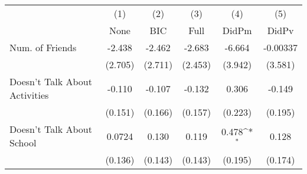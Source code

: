 {
\def\sym#1{\ifmmode^{#1}\else\(^{#1}\)\fi}
\begin{tabular}{l*{5}{c}}
\toprule
            &\multicolumn{1}{c}{(1)}&\multicolumn{1}{c}{(2)}&\multicolumn{1}{c}{(3)}&\multicolumn{1}{c}{(4)}&\multicolumn{1}{c}{(5)}\\
            &\multicolumn{1}{c}{None}&\multicolumn{1}{c}{BIC}&\multicolumn{1}{c}{Full}&\multicolumn{1}{c}{DidPm}&\multicolumn{1}{c}{DidPv}\\
\midrule
Num. of Friends&      -2.438         &      -2.462         &      -2.683         &      -6.664         &    -0.00337         \\
            &     (2.705)         &     (2.711)         &     (2.453)         &     (3.942)         &     (3.581)         \\
\addlinespace
Doesn't Talk About Activities&      -0.110         &      -0.107         &      -0.132         &       0.306         &      -0.149         \\
            &     (0.151)         &     (0.166)         &     (0.157)         &     (0.223)         &     (0.195)         \\
\addlinespace
Doesn't Talk About School&      0.0724         &       0.130         &       0.119         &       0.478\sym{*}  &       0.128         \\
            &     (0.136)         &     (0.143)         &     (0.143)         &     (0.195)         &     (0.174)         \\
\bottomrule
\end{tabular}
}
